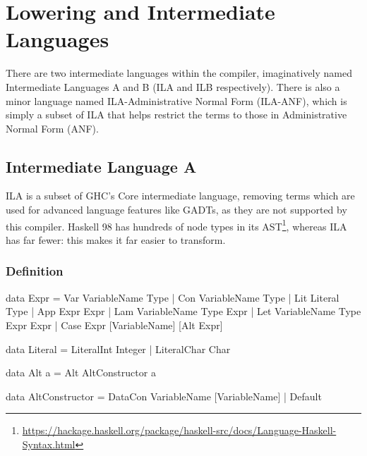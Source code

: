 \documentclass[dissertation.tex]{subfiles}
\begin{document}
\section{Lowering and Intermediate Languages}
{

    There are two intermediate languages within the compiler, imaginatively named Intermediate Languages A and B
    (ILA and ILB respectively). There is also a minor language named ILA-Administrative Normal Form (ILA-ANF), which
    is simply a subset of ILA that helps restrict the terms to those in Administrative Normal Form (ANF).


    \subsection{Intermediate Language A}
    {

        ILA is a subset of GHC's Core intermediate language, removing terms which are used for advanced language
        features like GADTs, as they are not supported by this compiler. Haskell 98 has hundreds of node types in
        its
        AST\footnote{\url{https://hackage.haskell.org/package/haskell-src/docs/Language-Haskell-Syntax.html}}, whereas ILA has far fewer: this makes it far easier to transform.

        \subsubsection{Definition}
        {

            \begin{haskellfigure}
            data Expr = Var VariableName Type
                      | Con VariableName Type
                      | Lit Literal Type
                      | App Expr Expr
                      | Lam VariableName Type Expr
                      | Let VariableName Type Expr Expr
                      | Case Expr [VariableName] [Alt Expr]

            data Literal = LiteralInt Integer
                         | LiteralChar Char

            data Alt a = Alt AltConstructor a

            data AltConstructor = DataCon VariableName [VariableName]
                                | Default


\end{haskellfigure}}}}
\end{document}
